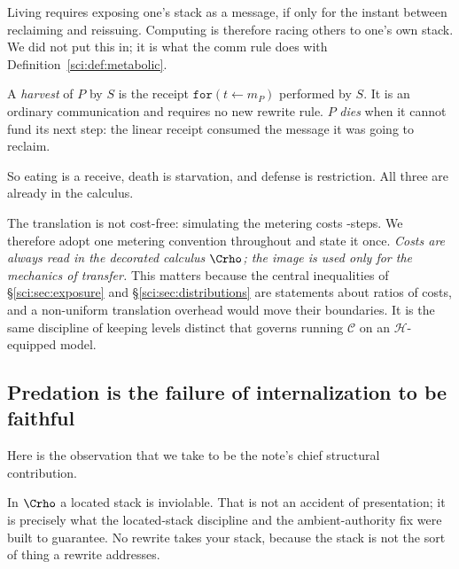 \begin{remark}
\label{sci:rem:race}
Living requires exposing one's stack as a message, if only for the instant between reclaiming and
reissuing. Computing is therefore racing others to one's own stack. We did not put this in; it is
what the comm rule does with Definition~\ref{sci:def:metabolic}.
\end{remark}

\begin{definition}
\label{sci:def:harvest}
A \emph{harvest} of $P$ by $S$ is the receipt $\texttt{for}(t \leftarrow m_P)$ performed by $S$. It is
an ordinary communication and requires no new rewrite rule. $P$ \emph{dies} when it cannot fund its
next step: the linear receipt consumed the message it was going to reclaim.
\end{definition}

So eating is a receive, death is starvation, and defense is restriction. All three are already in the
calculus.

\begin{remark}\label{sci:one-ledger}
The translation is not cost-free: simulating the metering costs \rhoc-steps. We therefore adopt one
metering convention throughout and state it once. \emph{Costs are always read in the decorated
calculus $\Crho$; the image is used only for the mechanics of transfer.} This matters because the
central inequalities of \S\ref{sci:sec:exposure} and \S\ref{sci:sec:distributions} are statements about ratios
of costs, and a non-uniform translation overhead would move their boundaries. It is the same
discipline of keeping levels distinct that governs running $\mathcal{C}$ on an
$\mathcal{H}$-equipped model.
\end{remark}

\subsection{Predation is the failure of internalization to be faithful}\label{sci:S7.3}

Here is the observation that we take to be the note's chief structural contribution.

In $\Crho$ a located stack is inviolable. That is not an accident of presentation; it is precisely
what the located-stack discipline and the ambient-authority fix were built to guarantee. No rewrite
takes your stack, because the stack is not the sort of thing a rewrite addresses.

